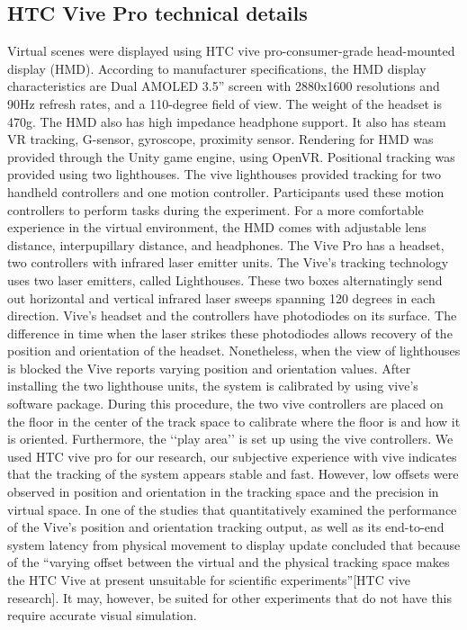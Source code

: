 \subsection{HTC Vive Pro technical details}
Virtual scenes were displayed using HTC vive pro-consumer-grade head-mounted display (HMD). According to manufacturer specifications, the HMD display characteristics are Dual AMOLED 3.5” screen with 2880x1600 resolutions and 90Hz refresh rates, and a 110-degree field of view. The weight of the headset is 470g. The HMD also has high impedance headphone support. It also has steam VR tracking, G-sensor, gyroscope, proximity sensor. Rendering for HMD was provided through the Unity game engine, using OpenVR. Positional tracking was provided using two lighthouses. The vive lighthouses provided tracking for two handheld controllers and one motion controller. Participants used these motion controllers to perform tasks during the experiment. For a more comfortable experience in the virtual environment, the HMD comes with adjustable lens distance, interpupillary distance, and headphones. 
The Vive Pro has a headset, two controllers with infrared laser emitter units. The Vive’s tracking technology uses two laser emitters, called Lighthouses. These two boxes alternatingly send out horizontal and vertical infrared laser sweeps spanning 120 degrees in each direction. 
Vive’s headset and the controllers have photodiodes on its surface. The difference in time when the laser strikes these photodiodes allows recovery of the position and orientation of the headset. Nonetheless, when the view of lighthouses is blocked the Vive reports varying position and orientation values. 
After installing the two lighthouse units, the system is calibrated by using vive’s software package. During this procedure, the two vive controllers are placed on the floor in the center of the track space to calibrate where the floor is and how it is oriented. Furthermore, the ‘‘play area’’ is set up using the vive controllers. We used HTC vive pro for our research, our subjective experience with vive indicates that the tracking of the system appears stable and fast.
However, low offsets were observed in position and orientation in the tracking space and the precision in virtual space. In one of the studies that quantitatively examined the performance of the Vive’s position and orientation tracking output, as well as its end-to-end system latency from physical movement to display update concluded that because of the “varying offset between the virtual and the physical tracking space makes the HTC Vive at present unsuitable for scientific experiments”[HTC vive research]. It may, however, be suited for other experiments that do not have this require accurate visual simulation.


